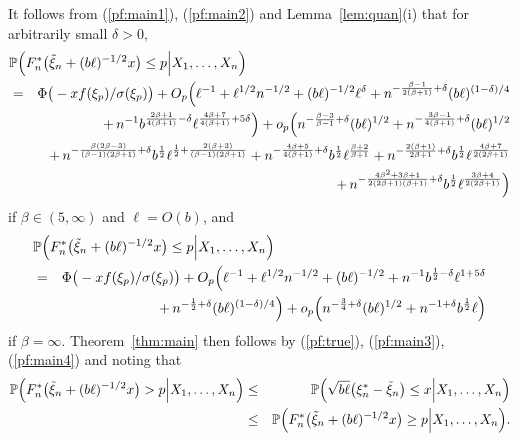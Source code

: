 \documentclass[a4paper, 12pt]{article}
\theoremstyle{plain}
\theoremstyle{definition}
\newcommand{\prob}{{\Bbb P}}
\begin{document}
It follows from (\ref{pf:main1}), (\ref{pf:main2}) and Lemma~\ref{lem:quan}(i) that for arbitrarily small $\delta>0$,
\begin{eqnarray}
\lefteqn{\prob\Big(F^*_n\big(\tilde\xi_n+(b\ell)^{-1/2}x\big)\le p\Big|X_1,\ldots,X_n\Big)}\nonumber\\
&=&\Phi\big(-xf(\xi_p)
/\sigma(\xi_p)\big)+
O_p\Big(\ell^{-1}+\ell^{1/2}n^{-1/2}+(b\ell)^{-1/2}\ell^\delta+n^{-\frac{\beta-1}{2(\beta+1)}+\delta}(b\ell)^{(1-\delta)/4}\nonumber\\
&&+\,n^{-1}b^{\frac{2\beta+1}{4(\beta+1)}-\delta}
\ell^{\frac{4\beta+7}{4(\beta+1)}+5\delta}
\Big)+
o_p\Big(
n^{-\frac{\beta-3}{\beta-1}+\delta}(b\ell)^{1/2}+n^{-\frac{3\beta-1}{4(\beta+1)}+\delta}(b\ell)^{1/2}
\nonumber\\
&&+\,n^{-\frac{\beta(2\beta-3)}{(\beta-1)(2\beta+1)}+\delta}b^{\frac{1}{2}}
\ell^{\frac{1}{2}+\frac{2(\beta+3)}{(\beta-1)(2\beta+1)}}+
n^{-\frac{4\beta+5}{4(\beta+1)}+\delta}b^{\frac{1}{2}}
\ell^{\frac{\beta+2}{\beta+1}}+n^{-\frac{2(\beta+1)}{2\beta+1}+\delta}b^{\frac{1}{2}}
\ell^{\frac{4\beta+7}{2(2\beta+1)}}\nonumber\\
&&+\,n^{-\frac{4\beta^2+3\beta+1}{2(2\beta+1)(\beta+1)}+\delta}
b^{\frac{1}{2}}\ell^{\frac{3\beta+4}{2(2\beta+1)}}\Big) \nonumber \\
\label{pf:main3}
\end{eqnarray}
if $\beta\in(5,\infty)$ and $\ell=O(b)$, and
\begin{eqnarray}
\lefteqn{\prob\Big(F^*_n\big(\tilde\xi_n+(b\ell)^{-1/2}x\big)\le p\Big|X_1,\ldots,X_n\Big)}\nonumber\\
&=&\Phi\big(-xf(\xi_p)
/\sigma(\xi_p)\big)+
O_p\Big(\ell^{-1}+\ell^{1/2}n^{-1/2}+(b\ell)^{-1/2}
+n^{-1}b^{\frac{1}{2}-\delta}
\ell^{1+5\delta}\nonumber\\
&&+\,n^{-\frac{1}{2}+\delta}(b\ell)^{(1-\delta)/4}\Big)
+o_p\Big(
n^{-\frac{3}{4}+\delta}(b\ell)^{1/2}+n^{-1+\delta}b^{\frac{1}{2}}\ell\Big)
\label{pf:main4}
\end{eqnarray}
if $\beta=\infty$. Theorem~\ref{thm:main} then follows by (\ref{pf:true}),
(\ref{pf:main3}), (\ref{pf:main4}) and noting that
\begin{eqnarray*}
\prob\Big(F^*_n\big(\tilde\xi_n+(b\ell)^{-1/2}x\big)>p\Big|X_1,\ldots,X_n\Big)
&\le&\prob\Big(\sqrt{b\ell}\big(\xi^*_n-\tilde\xi_n\big)\le x
\Big|X_1,\ldots,X_n\Big)\\
&\le&\prob\Big(F^*_n\big(\tilde\xi_n+(b\ell)^{-1/2}x\big)\ge p\Big|X_1,\ldots,X_n\Big).
\end{eqnarray*}
\end{document}
